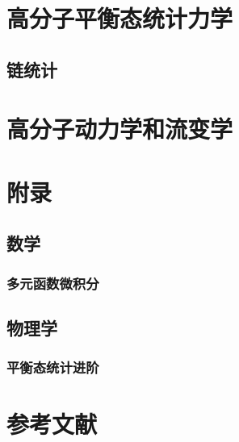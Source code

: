 \documentclass[zihao=5,linespread=1.3,b5paper,heading=true,twoside]{ctexbook}
\theoremstyle{definition}
\theoremstyle{plain}
\begin{document}
\part{高分子平衡态统计力学}
\chapter{链统计}
\part{高分子动力学和流变学}

\part{附录}
\chapter{数学}
\section{多元函数微积分}

\chapter{物理学}
\section{平衡态统计进阶}


\newpage\part*{参考文献}
\printbibliography[heading=none]
\end{document}

